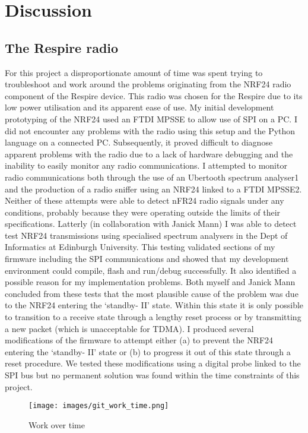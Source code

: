 \chapter{Discussion}

\section{The Respire radio}
For this project a disproportionate amount of time was spent trying to troubleshoot and work
around the problems originating from the NRF24 radio component of the Respire device. This radio
was chosen for the Respire due to its low power utilisation and its apparent ease of use. My initial
development prototyping of the NRF24 used an FTDI MPSSE to allow use of SPI on a PC. I did not
encounter any problems with the radio using this setup and the Python language on a connected PC.
Subsequently, it proved difficult to diagnose apparent problems with the radio due to a lack of
hardware debugging and the inability to easily monitor any radio communications. I attempted to
monitor radio communications both through the use of an Ubertooth spectrum analyser1 and the
production of a radio sniffer using an NRF24 linked to a FTDI MPSSE2. Neither of these attempts
were able to detect nFR24 radio signals under any conditions, probably because they were operating
outside the limits of their specifications. Latterly (in collaboration with Janick Mann) I was able to
detect test NRF24 transmissions using specialised spectrum analysers in the Dept of Informatics at
Edinburgh University. This testing validated sections of my firmware including the SPI
communications and showed that my development environment could compile, flash and
run/debug successfully. It also identified a possible reason for my implementation problems. Both
myself and Janick Mann concluded from these tests that the most plausible cause of the problem
was due to the NRF24 entering the ‘standby- II’ state. Within this state it is only possible to
transition to a receive state through a lengthy reset process or by transmitting a new packet (which
is unacceptable for TDMA). I produced several modifications of the firmware to attempt either (a) to
prevent the NRF24 entering the ‘standby- II’ state or (b) to progress it out of this state through a
reset procedure. We tested these modifications using a digital probe linked to the SPI bus but no
permanent solution was found within the time constraints of this project.

\begin{figure}[htb]
  \centering
  \texttt{[image: images/git\_work\_time.png]}
  \caption{Work over time}
  \label{fig:git_work_time}
\end{figure}

